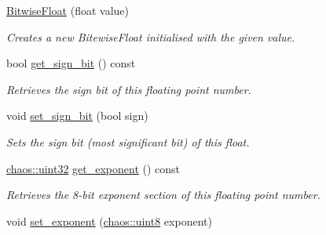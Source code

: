 \begin{DoxyCompactItemize}
\item 
\hypertarget{unionchaos_1_1data_1_1_bitwise_float_a7713ceaaa7cf2a487304088003d94135}{\hyperlink{unionchaos_1_1data_1_1_bitwise_float_a7713ceaaa7cf2a487304088003d94135}{Bitwise\-Float} (float value)}\label{unionchaos_1_1data_1_1_bitwise_float_a7713ceaaa7cf2a487304088003d94135}

\begin{DoxyCompactList}\small\item\em Creates a new Bitewise\-Float initialised with the given value. \end{DoxyCompactList}\item 
\hypertarget{unionchaos_1_1data_1_1_bitwise_float_aec1ad0a94dcf984131cc528b574c7d2d}{bool \hyperlink{unionchaos_1_1data_1_1_bitwise_float_aec1ad0a94dcf984131cc528b574c7d2d}{get\-\_\-sign\-\_\-bit} () const }\label{unionchaos_1_1data_1_1_bitwise_float_aec1ad0a94dcf984131cc528b574c7d2d}

\begin{DoxyCompactList}\small\item\em Retrieves the sign bit of this floating point number. \end{DoxyCompactList}\item 
\hypertarget{unionchaos_1_1data_1_1_bitwise_float_a53663822515d674b2fbcad78a758559c}{void \hyperlink{unionchaos_1_1data_1_1_bitwise_float_a53663822515d674b2fbcad78a758559c}{set\-\_\-sign\-\_\-bit} (bool sign)}\label{unionchaos_1_1data_1_1_bitwise_float_a53663822515d674b2fbcad78a758559c}

\begin{DoxyCompactList}\small\item\em Sets the sign bit (most significant bit) of this float. \end{DoxyCompactList}\item 
\hypertarget{unionchaos_1_1data_1_1_bitwise_float_a18da7f215f0f901943f24556cd9f1f4e}{\hyperlink{namespacechaos_a8641b3ae4551f0b35570d4f9f4ec22d9}{chaos\-::uint32} \hyperlink{unionchaos_1_1data_1_1_bitwise_float_a18da7f215f0f901943f24556cd9f1f4e}{get\-\_\-exponent} () const }\label{unionchaos_1_1data_1_1_bitwise_float_a18da7f215f0f901943f24556cd9f1f4e}

\begin{DoxyCompactList}\small\item\em Retrieves the 8-\/bit exponent section of this floating point number. \end{DoxyCompactList}\item 
\hypertarget{unionchaos_1_1data_1_1_bitwise_float_af3558e3752a224efb2b5e1b7df0ff473}{void \hyperlink{unionchaos_1_1data_1_1_bitwise_float_af3558e3752a224efb2b5e1b7df0ff473}{set\-\_\-exponent} (\hyperlink{namespacechaos_acbc0796d6929e3182cfd4f5c0176ab51}{chaos\-::uint8} exponent)}\label{unionchaos_1_1data_1_1_bitwise_float_af3558e3752a224efb2b5e1b7df0ff473}


\end{DoxyCompactItemize}
